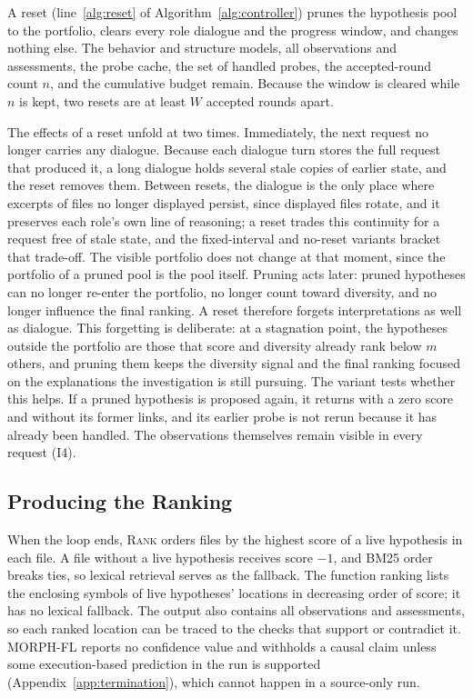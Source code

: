 \documentclass[letterpaper,journal]{IEEEtran}
\newcommand{\tool}{MORPH-FL}
\newcommand{\code}[1]{\texttt{\detokenize{#1}}}
\begin{document}
A reset (line~\ref{alg:reset} of Algorithm~\ref{alg:controller}) prunes the hypothesis pool to the portfolio, clears every role dialogue and the progress window, and changes nothing else. The behavior and structure models, all observations and assessments, the probe cache, the set of handled probes, the accepted-round count $n$, and the cumulative budget remain. Because the window is cleared while $n$ is kept, two resets are at least $W$ accepted rounds apart.

The effects of a reset unfold at two times. Immediately, the next request no longer carries any dialogue. Because each dialogue turn stores the full request that produced it, a long dialogue holds several stale copies of earlier state, and the reset removes them. Between resets, the dialogue is the only place where excerpts of files no longer displayed persist, since displayed files rotate, and it preserves each role's own line of reasoning; a reset trades this continuity for a request free of stale state, and the fixed-interval and no-reset variants bracket that trade-off. The visible portfolio does not change at that moment, since the portfolio of a pruned pool is the pool itself. Pruning acts later: pruned hypotheses can no longer re-enter the portfolio, no longer count toward diversity, and no longer influence the final ranking. A reset therefore forgets interpretations as well as dialogue. This forgetting is deliberate: at a stagnation point, the hypotheses outside the portfolio are those that score and diversity already rank below $m$ others, and pruning them keeps the diversity signal and the final ranking focused on the explanations the investigation is still pursuing. The \code{context_only} variant tests whether this helps. If a pruned hypothesis is proposed again, it returns with a zero score and without its former links, and its earlier probe is not rerun because it has already been handled. The observations themselves remain visible in every request (I4).

\subsection{Producing the Ranking}\label{sec:output}
When the loop ends, \textsc{Rank} orders files by the highest score of a live hypothesis in each file. A file without a live hypothesis receives score $-1$, and BM25 order breaks ties, so lexical retrieval serves as the fallback. The function ranking lists the enclosing symbols of live hypotheses' locations in decreasing order of score; it has no lexical fallback. The output also contains all observations and assessments, so each ranked location can be traced to the checks that support or contradict it. \tool{} reports no confidence value and withholds a causal claim unless some execution-based prediction in the run is supported (Appendix~\ref{app:termination}), which cannot happen in a source-only run.
\end{document}
